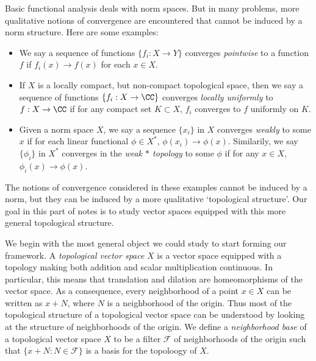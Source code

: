 Basic functional analysis deals with norm spaces. But in many problems, more qualitative notions of convergence are encountered that cannot be induced by a norm structure. Here are some examples:
%
\begin{itemize}
    \item We say a sequence of functions $\{ f_i: X \to Y \}$ converges \emph{pointwise} to a function $f$ if $f_i(x) \to f(x)$ for each $x \in X$.

    \item If $X$ is a locally compact, but non-compact topological space, then we say a sequence of functions $\{ f_i: X \to \CC \}$ converges \emph{locally uniformly} to $f: X \to \CC$ if for any compact set $K \subset X$, $f_i$ converges to $f$ uniformly on $K$.

    \item Given a norm space $X$, we say a sequence $\{ x_i \}$ in $X$ converges \emph{weakly} to some $x$ if for each linear functional $\phi \in X^*$, $\phi(x_i) \to \phi(x)$. Similarily, we say $\{ \phi_i \}$ in $X^*$ converges in the \emph{weak $*$ topology} to some $\phi$ if for any $x \in X$, $\phi_i(x) \to \phi(x)$.
\end{itemize}
%
The notions of convergence considered in these examples cannot be induced by a norm, but they can be induced by a more qualitative `topological structure'. Our goal in this part of notes is to study vector spaces equipped with this more general topological structure.

We begin with the most general object we could study to start forming our framework.
A \emph{topological vector space} $X$ is a vector space equipped with a topology making both addition and scalar multiplication continuous.
In particular, this means that translation and dilation are homeomorphisms of the vector space.
As a consequence, every neighborhood of a point $x \in X$ can be written as $x + N$, where $N$ is a neighborhood of the origin. Thus most of the topological structure of a topological vector space can be understood by looking at the structure of neighborhoods of the origin. We define a \emph{neighborhood base} of a topological vector space $X$ to be a filter $\mathcal{F}$ of neighborhoods of the origin such that $\{ x + N : N \in \mathcal{F} \}$ is a basis for the topoloogy of $X$.

